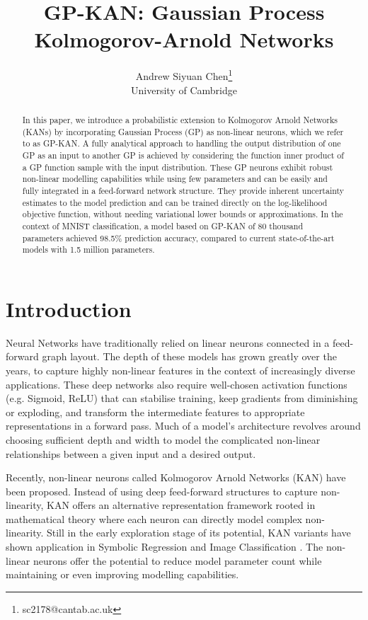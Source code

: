 \documentclass{article}
\title{GP-KAN: Gaussian Process Kolmogorov-Arnold Networks}
\author{
	{\hspace{1mm}Andrew Siyuan Chen}\thanks{sc2178@cantab.ac.uk} \\
	University of Cambridge
}
\begin{document}
\maketitle

\begin{abstract}
    In this paper, we introduce a probabilistic extension to Kolmogorov Arnold Networks (KANs) by incorporating Gaussian Process (GP) as non-linear neurons, which we refer to as GP-KAN. A fully analytical approach to handling the output distribution of one GP as an input to another GP is achieved by considering the function inner product of a GP function sample with the input distribution. These GP neurons exhibit robust non-linear modelling capabilities while using few parameters and can be easily and fully integrated in a feed-forward network structure. They provide inherent uncertainty estimates to the model prediction and can be trained directly on the log-likelihood objective function, without needing variational lower bounds or approximations. In the context of MNIST classification, a model based on GP-KAN of 80 thousand parameters achieved 98.5\% prediction accuracy, compared to current state-of-the-art models with 1.5 million parameters.
\end{abstract}




\section{Introduction}
Neural Networks have traditionally relied on linear neurons \cite{ANN} connected in a feed-forward graph layout. The depth of these models has grown greatly over the years, to capture highly non-linear features in the context of increasingly diverse applications. These deep networks also require well-chosen activation functions (e.g. Sigmoid, ReLU) that can stabilise training, keep gradients from diminishing or exploding, and transform the intermediate features to appropriate representations in a forward pass. Much of a model's architecture revolves around choosing sufficient depth and width to model the complicated non-linear relationships between a given input and a desired output.

Recently, non-linear neurons called Kolmogorov Arnold Networks (KAN) \cite{liu2024kan} have been proposed. Instead of using deep feed-forward structures to capture non-linearity, KAN offers an alternative representation framework rooted in mathematical theory where each neuron can directly model complex non-linearity. Still in the early exploration stage of its potential, KAN variants have shown application in Symbolic Regression and Image Classification \cite{ConvolutionalKAN}. The non-linear neurons offer the potential to reduce model parameter count while maintaining or even improving modelling capabilities.
\end{document}
